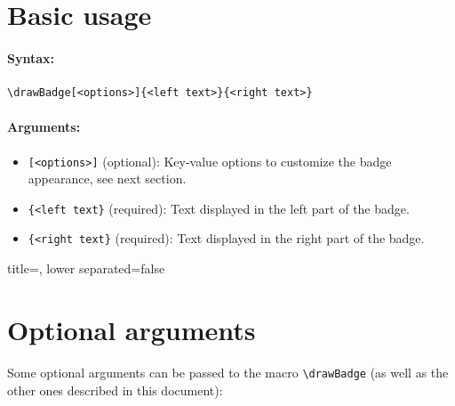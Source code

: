 \section{Basic usage}

\paragraph{Syntax:}
\begin{verbatim}
\drawBadge[<options>]{<left text>}{<right text>}
\end{verbatim}

\paragraph{Arguments:}
\begin{itemize}
    \item \texttt{[<options>]} (optional): Key-value options to customize the badge appearance, see next section.
    \item \texttt{\{<left text\}} (required): Text displayed in the left part of the badge.
    \item \texttt{\{<right text\}} (required): Text displayed in the right part of the badge.
\end{itemize}

\begin{tcblisting}{title={\tikzshields}, lower separated=false}
\end{tcblisting}


\section{Optional arguments}
\label{sec:args}

Some optional arguments can be passed to the macro \texttt{\textbackslash{}drawBadge} (as well as the other ones described in this document):

